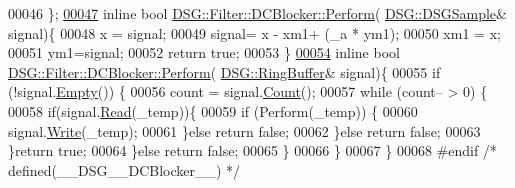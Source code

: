 \begin{DoxyCode}
00046         \};
\hypertarget{_d_c_blocker_8h_source_l00047}{}\hyperlink{class_d_s_g_1_1_filter_1_1_d_c_blocker_a9757794b5f9b7789132e5eaa44e07cef}{00047}         \textcolor{keyword}{inline} \textcolor{keywordtype}{bool} \hyperlink{class_d_s_g_1_1_filter_1_1_d_c_blocker_a9757794b5f9b7789132e5eaa44e07cef}{DSG::Filter::DCBlocker::Perform}(
      \hyperlink{namespace_d_s_g_ac39a94cd27ebcd9c1e7502d0c624894a}{DSG::DSGSample}& signal)\{
00048             x = signal;
00049             signal= x - xm1+ (\_a * ym1);
00050             xm1 = x;
00051             ym1=signal;
00052             \textcolor{keywordflow}{return} \textcolor{keyword}{true};
00053         \}
\hypertarget{_d_c_blocker_8h_source_l00054}{}\hyperlink{class_d_s_g_1_1_filter_1_1_d_c_blocker_a690b2fdc8fdb749d9832d8d744b8cb2f}{00054}         \textcolor{keyword}{inline} \textcolor{keywordtype}{bool} \hyperlink{class_d_s_g_1_1_filter_1_1_d_c_blocker_a9757794b5f9b7789132e5eaa44e07cef}{DSG::Filter::DCBlocker::Perform}(
      \hyperlink{class_d_s_g_1_1_ring_buffer}{DSG::RingBuffer}& signal)\{
00055             \textcolor{keywordflow}{if} (!signal.\hyperlink{class_d_s_g_1_1_ring_buffer_ac1346f5842d08b988a5297abe4089b96}{Empty}()) \{
00056                 count = signal.\hyperlink{class_d_s_g_1_1_ring_buffer_a9bd79b0a6dff618b205e396c101ee070}{Count}();
00057                 \textcolor{keywordflow}{while} (count-- > 0) \{
00058                     \textcolor{keywordflow}{if}(signal.\hyperlink{class_d_s_g_1_1_ring_buffer_a6b2848a64f15c7b0c320779582fa0fbe}{Read}(\_temp))\{
00059                         \textcolor{keywordflow}{if} (Perform(\_temp)) \{
00060                             signal.\hyperlink{class_d_s_g_1_1_ring_buffer_aa5dd2caa0a270173251faee40a43d692}{Write}(\_temp);
00061                         \}\textcolor{keywordflow}{else} \textcolor{keywordflow}{return} \textcolor{keyword}{false};
00062                     \}\textcolor{keywordflow}{else} \textcolor{keywordflow}{return} \textcolor{keyword}{false};
00063                 \}\textcolor{keywordflow}{return} \textcolor{keyword}{true};
00064             \}\textcolor{keywordflow}{else} \textcolor{keywordflow}{return} \textcolor{keyword}{false};
00065         \}
00066     \}
00067 \}
00068 \textcolor{preprocessor}{#endif }\textcolor{comment}{/* defined(\_\_DSG\_\_DCBlocker\_\_) */}\textcolor{preprocessor}{}
\end{DoxyCode}
